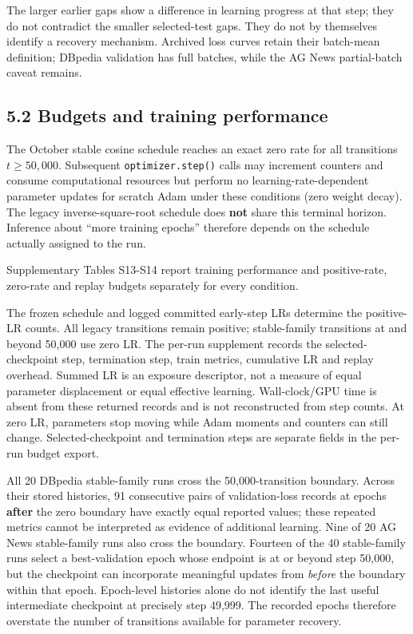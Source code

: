 \documentclass[smallextended]{svjour3}
\begin{document}
The larger earlier gaps show a difference in learning progress at that step; they do not contradict the smaller selected-test gaps. They do not by themselves identify a recovery mechanism. Archived loss curves retain their batch-mean definition; DBpedia validation has full batches, while the AG News partial-batch caveat remains.

\subsection{5.2 Budgets and training performance}\label{budgets-and-training-performance}

The October stable cosine schedule reaches an exact zero rate for all transitions \(t\ge50{,}000\). Subsequent \texttt{optimizer.step()} calls may increment counters and consume computational resources but perform no learning-rate-dependent parameter updates for scratch Adam under these conditions (zero weight decay). The legacy inverse-square-root schedule does \textbf{not} share this terminal horizon. Inference about ``more training epochs'' therefore depends on the schedule actually assigned to the run.

Supplementary Tables S13-S14 report training performance and positive-rate, zero-rate and replay budgets separately for every condition.

The frozen schedule and logged committed early-step LRs determine the positive-LR counts. All legacy transitions remain positive; stable-family transitions at and beyond 50,000 use zero LR. The per-run supplement records the selected-checkpoint step, termination step, train metrics, cumulative LR and replay overhead. Summed LR is an exposure descriptor, not a measure of equal parameter displacement or equal effective learning. Wall-clock/GPU time is absent from these returned records and is not reconstructed from step counts. At zero LR, parameters stop moving while Adam moments and counters can still change. Selected-checkpoint and termination steps are separate fields in the per-run budget export.

All 20 DBpedia stable-family runs cross the 50,000-transition boundary. Across their stored histories, 91 consecutive pairs of validation-loss records at epochs \textbf{after} the zero boundary have exactly equal reported values; these repeated metrics cannot be interpreted as evidence of additional learning. Nine of 20 AG News stable-family runs also cross the boundary. Fourteen of the 40 stable-family runs select a best-validation epoch whose endpoint is at or beyond step 50,000, but the checkpoint can incorporate meaningful updates from \emph{before} the boundary within that epoch. Epoch-level histories alone do not identify the last useful intermediate checkpoint at precisely step 49,999. The recorded epochs therefore overstate the number of transitions available for parameter recovery.
\end{document}
